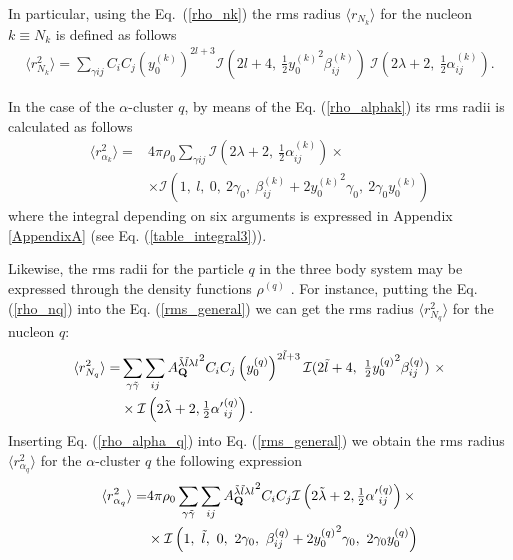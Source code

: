 \documentclass[
12pt, %
oneside, %
english, %
doublespacing, %
doublespacing, %
toctotoc, %
parskip, %
headsepline, %
]{MastersDoctoralThesis} %
\begin{document}
In particular, using the Eq.~(\ref{rho_nk}) the rms radius $\langle r_{N_k} \rangle$ for the nucleon $k\equiv N_k$  is defined as follows
\begin{align}
\langle r_{N_k}^2 \rangle =\sum_{\gamma ij} 
C_iC_j  
\left( y_0^{(k)} \right)^{2l+3}
 \mathcal{I}(2l+4, ~\tfrac{1}{2} {y_0^{(k)}}^2 \beta^{(k)}_{ij})~
\mathcal{I}\left( 2\lambda+2, ~\tfrac{1}{2} \alpha_{ij}^{(k)} \right). 
\end{align}

In the case of the $\alpha$-cluster $q$, by means of the Eq. (\ref{rho_alphak}) its rms radii is calculated as follows
\begin{align}
\langle r_{\alpha_k}^2 \rangle =&4 \pi \rho_0
\sum_{\gamma ij} 
 \mathcal{I}\left( 2\lambda+2,~ \tfrac{1}{2} \alpha^{(k)}_{ij}\right) 
 \times \\
 & \times 
 \mathcal{I}\left(1, ~l,~0,~2\gamma_0,~\beta_{ij}^{(k)}+2{y^{(k)}_0}^2 \gamma_0,~2\gamma_0 y^{(k)}_0\right)
 \nonumber
\end{align}
where the integral depending on six arguments is expressed in Appendix \ref{AppendixA} (see Eq. (\ref{table_integral3})).

Likewise, the rms radii for the particle $q$  in the three body system may be expressed through the density functions $\rho^{(q)}$ . For instance, putting the Eq. (\ref{rho_nq}) into the Eq. (\ref{rms_general}) we can get the rms radius $\langle r_{N_q}^2 \rangle $ for the nucleon $q$:
\begin{align}
\langle r_{N_q}^2 \rangle  = &
\sum_{\gamma \tilde{\gamma}} \sum_{ij} 
{A^{\tilde{\lambda} \tilde{l} \lambda l}_{{\bf Q} }}^2
C_iC_j  
\left( y_0^{(q)} \right)^{2\tilde{l}+3}
 \mathcal{I}(2\tilde{l}+4, ~\tfrac{1}{2} {y_0^{(q)}}^2 \beta^{(q)}_{ij})~
 \times 
\\ \nonumber 
& \times 
\mathcal{I}\left( 2\tilde{\lambda}+2, \tfrac{1}{2} {\alpha'}_{ij}^{(q)} \right).
\end{align}
Inserting Eq. (\ref{rho_alpha_q}) into Eq. (\ref{rms_general}) we obtain the rms radius $\langle r_{\alpha_q}^2 \rangle$  for the $\alpha$-cluster $q$ the following expression 
\begin{align}
\langle r_{\alpha_q}^2 \rangle=&
4 \pi \rho_0
\sum_{\gamma \tilde{\gamma}} \sum_{ij} 
{A^{\tilde{\lambda} \tilde{l} \lambda l}_{{\bf Q} }}^2
  C_i C_j 
 \mathcal{I}\left( 2\tilde{\lambda}+2, \tfrac{1}{2} {\alpha'}^{(q)}_{ij}\right) \times \\
 & \times \mathcal{I}\left(1, ~\tilde{l},~0,~2\gamma_0,~\beta_{ij}^{(q)}+2{y^{(q)}_0}^2 \gamma_0,~2\gamma_0 y^{(q)}_0\right)
 \nonumber
\end{align}
\end{document}
